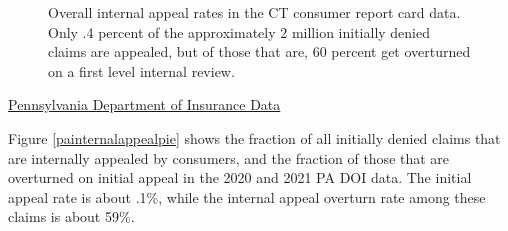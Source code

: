 \documentclass[12pt, a4paper,twoside,parskip=full]{report}
\theoremstyle{plain} %
\theoremstyle{definition} %
\theoremstyle{remark} %
\numberwithin{equation}{chapter}
\begin{document}
\begin{figure}[h!]
\begin{subfigure}[b]{0.49\textwidth}
			\end{subfigure}
			\caption{Overall internal appeal rates in the CT consumer report card data. Only .4 percent of the approximately 2 million initially denied claims are appealed, but of those that are, 60 percent get overturned on a first level internal review.}
			\label{ctinternalappealpie}
		\end{figure}
		
		
		\underline{Pennsylvania Department of Insurance Data}
		
		
		Figure \ref{painternalappealpie} shows the fraction of all initially denied claims that are internally appealed by consumers, and the fraction of those that are overturned on initial appeal in the 2020 and 2021 PA DOI data. The initial appeal rate is about .1\%, while the internal appeal overturn rate among these claims is about 59\%.
		
\end{document}
